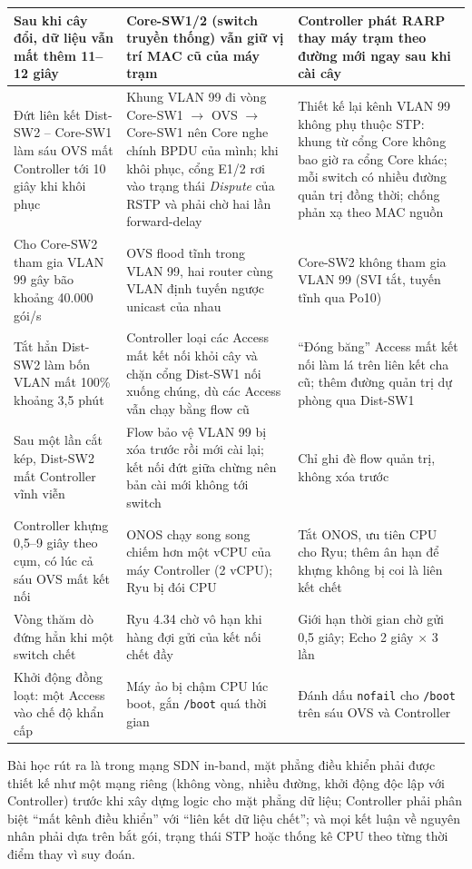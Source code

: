 \begin{longtable}{|P{3.0cm}|P{5.2cm}|P{5.3cm}|}
    \hline
    Sau khi cây đổi, dữ liệu vẫn mất thêm 11--12 giây & Core-SW1/2 (switch truyền thống) vẫn giữ vị trí MAC cũ của máy trạm & Controller phát RARP thay máy trạm theo đường mới ngay sau khi cài cây \\
    \hline
    Đứt liên kết Dist-SW2 -- Core-SW1 làm sáu OVS mất Controller tới 10 giây khi khôi phục & Khung VLAN 99 đi vòng Core-SW1 $\rightarrow$ OVS $\rightarrow$ Core-SW1 nên Core nghe chính BPDU của mình; khi khôi phục, cổng E1/2 rơi vào trạng thái \textit{Dispute} của RSTP và phải chờ hai lần forward-delay & Thiết kế lại kênh VLAN 99 không phụ thuộc STP: khung từ cổng Core không bao giờ ra cổng Core khác; mỗi switch có nhiều đường quản trị đồng thời; chống phản xạ theo MAC nguồn \\
    \hline
    Cho Core-SW2 tham gia VLAN 99 gây bão khoảng 40.000 gói/s & OVS flood tĩnh trong VLAN 99, hai router cùng VLAN định tuyến ngược unicast của nhau & Core-SW2 không tham gia VLAN 99 (SVI tắt, tuyến tĩnh qua Po10) \\
    \hline
    Tắt hẳn Dist-SW2 làm bốn VLAN mất 100\% khoảng 3,5 phút & Controller loại các Access mất kết nối khỏi cây và chặn cổng Dist-SW1 nối xuống chúng, dù các Access vẫn chạy bằng flow cũ & ``Đóng băng'' Access mất kết nối làm lá trên liên kết cha cũ; thêm đường quản trị dự phòng qua Dist-SW1 \\
    \hline
    Sau một lần cắt kép, Dist-SW2 mất Controller vĩnh viễn & Flow bảo vệ VLAN 99 bị xóa trước rồi mới cài lại; kết nối đứt giữa chừng nên bản cài mới không tới switch & Chỉ ghi đè flow quản trị, không xóa trước \\
    \hline
    Controller khựng 0,5--9 giây theo cụm, có lúc cả sáu OVS mất kết nối & ONOS chạy song song chiếm hơn một vCPU của máy Controller (2 vCPU); Ryu bị đói CPU & Tắt ONOS, ưu tiên CPU cho Ryu; thêm ân hạn để khựng không bị coi là liên kết chết \\
    \hline
    Vòng thăm dò đứng hẳn khi một switch chết & Ryu 4.34 chờ vô hạn khi hàng đợi gửi của kết nối chết đầy & Giới hạn thời gian chờ gửi 0,5 giây; Echo 2 giây $\times$ 3 lần \\
    \hline
    Khởi động đồng loạt: một Access vào chế độ khẩn cấp & Máy ảo bị chậm CPU lúc boot, gắn \texttt{/boot} quá thời gian & Đánh dấu \texttt{nofail} cho \texttt{/boot} trên sáu OVS và Controller \\
\end{longtable}
\endgroup

Bài học rút ra là trong mạng SDN in-band, mặt phẳng điều khiển phải được thiết kế như một mạng riêng (không vòng, nhiều đường, khởi động độc lập với Controller) trước khi xây dựng logic cho mặt phẳng dữ liệu; Controller phải phân biệt ``mất kênh điều khiển'' với ``liên kết dữ liệu chết''; và mọi kết luận về nguyên nhân phải dựa trên bắt gói, trạng thái STP hoặc thống kê CPU theo từng thời điểm thay vì suy đoán.

